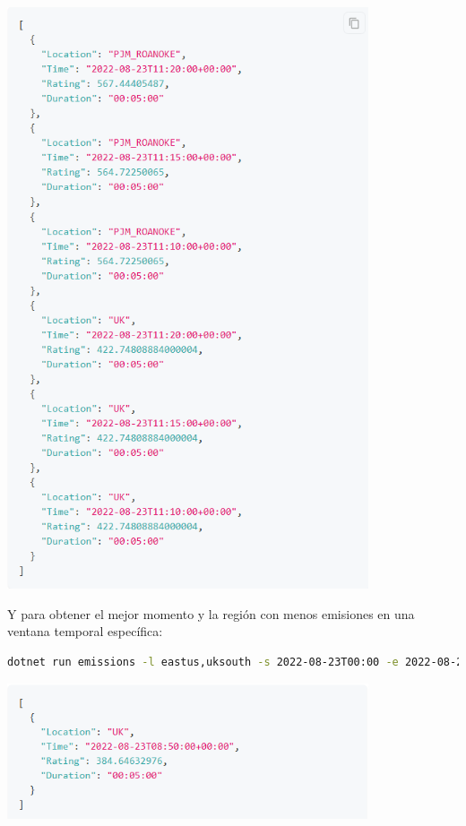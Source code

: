 \documentclass[12pt,a4paper]{report}
\begin{document}
\begin{center}
\includegraphics[width=0.8\textwidth]{imagenes/CASDK_1.png}
\end{center}

Y para obtener el mejor momento y la región con menos emisiones en una ventana temporal específica:

\begin{tcolorbox}[colback=codebackground, colframe=codeborder, boxrule=0.8pt, arc=0mm, boxsep=5pt, left=5pt, right=5pt, top=5pt, bottom=5pt]
\begin{lstlisting}[language=bash]
dotnet run emissions -l eastus,uksouth -s 2022-08-23T00:00 -e 2022-08-23T23:59 --best
\end{lstlisting}
\end{tcolorbox}

\begin{center}
\includegraphics[width=0.8\textwidth]{imagenes/CASDK_2.png}
\end{center}
\end{document}
